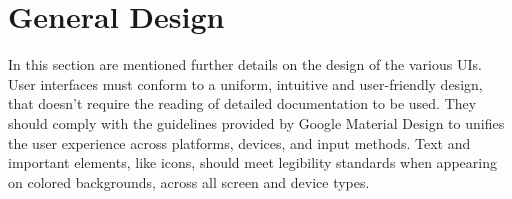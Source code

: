 \section{General Design}
In this section are mentioned further details on the design of the various UIs.
User interfaces must conform to a uniform, intuitive and user-friendly design, that doesn't require the reading of detailed documentation to be used.
They should comply with the guidelines provided by Google Material Design to unifies the user experience across platforms, devices, and input methods. Text and important elements, like icons, should meet legibility standards when appearing on colored backgrounds, across all screen and device types. 